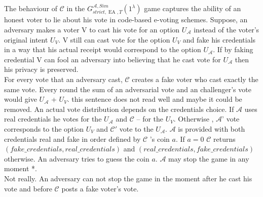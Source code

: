 \documentclass[12pt]{article}
\DeclareMathOperator{\ea}{EA}
\begin{document}
The behaviour of $\mathcal{C}$  in the  $G_{strict,\ea,T}^{\mathcal{A}, Sim}(1^{\lambda})$ game captures the ability of an honest voter to lie about his vote in code-based e-voting schemes. Suppose, an adversary  makes a voter V to cast his vote for an option $U_{\mathcal{A}}$ instead of the voter's original intent $U_{V}$.  V still can cast vote for the option $U_{V}$ and fake his credentials in a way that his actual receipt would correspond to the option $U_{\mathcal{A}}$. If by faking credential V can fool an adversary into believing that he cast vote for $U_{\mathcal{A}}$ then his privacy is preserved. \\

For every vote that an adversary cast, $\mathcal{C}$ creates a fake voter who cast exactly the same vote. Every round the sum of an adversarial vote and an challenger's vote would give $U_{\mathcal{A}}$ + $U_{V}$. {\color{red} this sentence does not read well and maybe it could be removed}. An actual vote distribution depends on the credentials choice. If $\mathcal{A}$ uses real credentials he votes for the $U_{\mathcal{A}}$ and  $\mathcal{C}$ --  for the $U_{V}$. Otherwise , $\mathcal{A}$' vote corresponds to  the  option $U_{V}$  and  $\mathcal{C}'$ vote to the $U_{\mathcal{A}}$. $\mathcal{A}$ is provided with both credentials real and fake in order defined by $\mathcal{C}$ 's coin $a$. If $a=0$ $\mathcal{C}$  returns $(fake\_credentials,real\_credentials)$ and $(real\_credentials,fake\_credentials)$ otherwise. An adversary tries to guess the coin $a$. $\mathcal{A}$ may stop the game in any moment  {\color{red}*}. \\
{\color{red} Not really. An adversary can not stop the game in the moment after he cast his vote and before $\mathcal{C}$ posts a fake voter's vote.}
\end{document}
